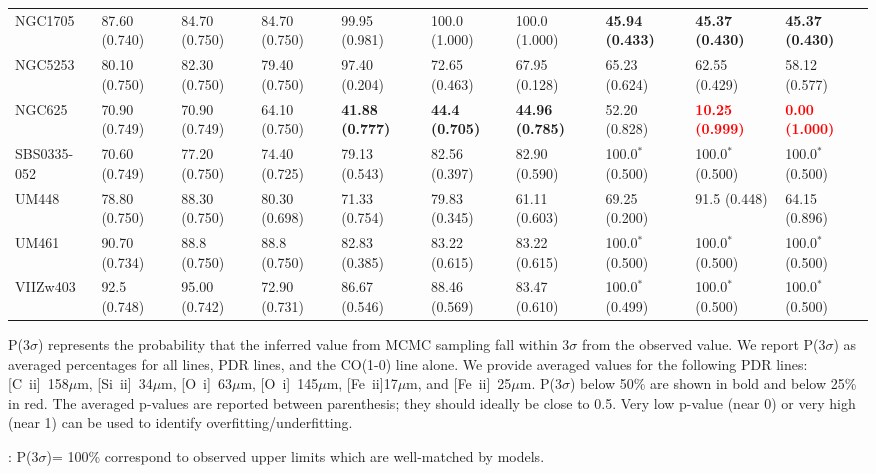 \documentclass{aa}
\newcommand{\oi}{[O~{\sc i}]}
\newcommand{\cii}{[C~{\sc ii}]}
\newcommand{\feii}{[Fe~{\sc ii}]}
\newcommand{\silii}{[Si~{\sc ii}]}
\begin{document}
\begin{appendix}
\begin{table}[h!]
\begin{threeparttable}
\begin{tabular}{|p{}|p{}p{}p{}|p{}p{}p{}|p{}p{}p{}|}
NGC1705&87.60 (0.740)&84.70 (0.750)&84.70 (0.750)&99.95 (0.981)&100.0 (1.000)&100.0 (1.000)&\textbf{45.94 (0.433)}&\textbf{45.37 (0.430)}&\textbf{45.37 (0.430)}\\
NGC5253&80.10 (0.750)&82.30 (0.750)&79.40 (0.750)&97.40 (0.204)&72.65 (0.463)&67.95 (0.128)&65.23 (0.624)&62.55 (0.429)&58.12 (0.577)\\
NGC625&70.90 (0.749)&70.90 (0.749)&64.10 (0.750)&\textbf{41.88 (0.777)}&\textbf{44.4 (0.705)}&\textbf{44.96 (0.785)}&52.20 (0.828)&\textbf{\textcolor{red}{10.25 (0.999)}}&\textbf{\textcolor{red}{0.00 (1.000)}}\\
SBS0335-052&70.60 (0.749)&77.20 (0.750)&74.40 (0.725)&79.13 (0.543)&82.56 (0.397)&82.90 (0.590)&100.0$^*$ (0.500)&100.0$^*$ (0.500)&100.0$^*$ (0.500)\\
UM448&78.80 (0.750)&88.30 (0.750)&80.30 (0.698)&71.33 (0.754)&79.83 (0.345)&61.11 (0.603)&69.25 (0.200)&91.5 (0.448)&64.15 (0.896)\\
UM461&90.70 (0.734)&88.8 (0.750)&88.8 (0.750)&82.83 (0.385)&83.22 (0.615)&83.22 (0.615)&100.0$^*$ (0.500)&100.0$^*$ (0.500)&100.0$^*$ (0.500)\\
VIIZw403&92.5 (0.748)&95.00 (0.742)&72.90 (0.731)&86.67 (0.546)&88.46 (0.569)&83.47 (0.610)&100.0$^*$ (0.499)&100.0$^*$ (0.500)&100.0$^*$ (0.500)\\
\hline
\end{tabular}
\begin{tablenotes}
   \footnotesize
   \item P(3$\sigma$) represents the probability that the inferred value from MCMC sampling fall within 3$\sigma$ from the observed value. We report P(3$\sigma$) as averaged percentages for all lines, PDR lines, and the CO(1-0) line alone. We provide averaged values for the following PDR lines: \cii\ 158$\mu$m, \silii\ 34$\mu$m, \oi\ 63$\mu$m, \oi\ 145$\mu$m, \feii 17$\mu$m, and \feii\ 25$\mu$m. P(3$\sigma$) below 50\% are shown in bold and below 25\% in red. The averaged p-values are reported between parenthesis; they should ideally be close to 0.5. Very low p-value (near 0) or very high (near 1) can be used to identify overfitting/underfitting.
   \item * : P(3$\sigma$)= 100\% correspond to observed upper limits which are well-matched by models. 
\end{tablenotes}
\end{threeparttable}
\end{table}



\end{appendix}
\end{document}
